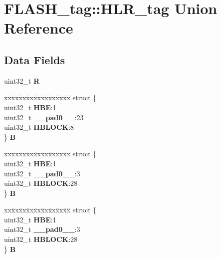 \hypertarget{unionFLASH__tag_1_1HLR__tag}{}\section{F\+L\+A\+S\+H\+\_\+tag\+::H\+L\+R\+\_\+tag Union Reference}
\label{unionFLASH__tag_1_1HLR__tag}
\subsection*{Data Fields}
\begin{DoxyCompactItemize}
\item 
\mbox{\label{unionFLASH__tag_1_1HLR__tag_ac57174350d83382f732300a3a827779b}} 
uint32\+\_\+t {\bfseries R}
\item 
\mbox{\label{unionFLASH__tag_1_1HLR__tag_a3fc3c7db097201e1352e3b649c2dcfd5}} 
\begin{tabbing}
xx\=xx\=xx\=xx\=xx\=xx\=xx\=xx\=xx\=\kill
struct \{\\
\>uint32\_t {\bfseries HBE}:1\\
\>uint32\_t {\bfseries \_\_pad0\_\_}:23\\
\>uint32\_t {\bfseries HBLOCK}:8\\
\} {\bfseries B}\\

\end{tabbing}\item 
\mbox{\label{unionFLASH__tag_1_1HLR__tag_a64ce1b43a559539f01414bcb568f21be}} 
\begin{tabbing}
xx\=xx\=xx\=xx\=xx\=xx\=xx\=xx\=xx\=\kill
struct \{\\
\>uint32\_t {\bfseries HBE}:1\\
\>uint32\_t {\bfseries \_\_pad0\_\_}:3\\
\>uint32\_t {\bfseries HBLOCK}:28\\
\} {\bfseries B}\\

\end{tabbing}\item 
\mbox{\label{unionFLASH__tag_1_1HLR__tag_ae8119a2afeed669ed6b46f3e477c506a}} 
\begin{tabbing}
xx\=xx\=xx\=xx\=xx\=xx\=xx\=xx\=xx\=\kill
struct \{\\
\>uint32\_t {\bfseries HBE}:1\\
\>uint32\_t {\bfseries \_\_pad0\_\_}:3\\
\>uint32\_t {\bfseries HBLOCK}:28\\
\} {\bfseries B}\\


\end{tabbing}
\end{DoxyCompactItemize}
